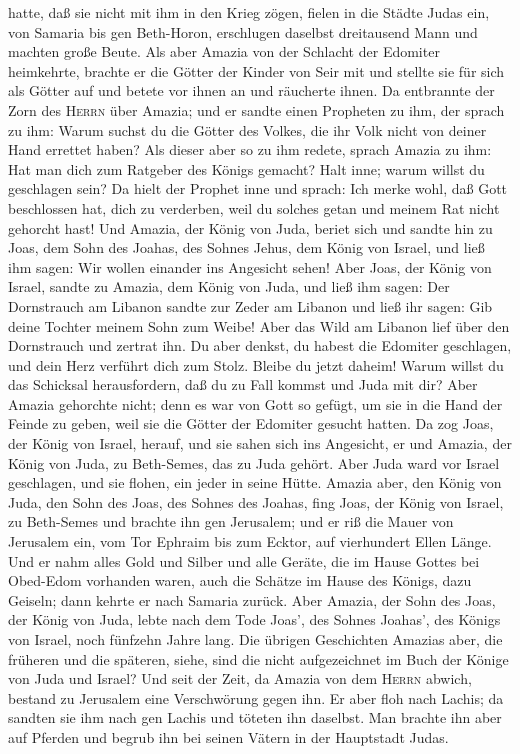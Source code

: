 hatte, daß sie nicht mit ihm in den Krieg zögen, fielen in die Städte
Judas ein, von Samaria bis gen Beth-Horon, erschlugen daselbst
dreitausend Mann und machten große Beute.  Als aber
Amazia von der Schlacht der Edomiter heimkehrte, brachte er die Götter
der Kinder von Seir mit und stellte sie für sich als Götter auf und
betete vor ihnen an und räucherte ihnen.  Da entbrannte
der Zorn des \textsc{Herrn} über Amazia; und er sandte einen Propheten
zu ihm, der sprach zu ihm: Warum suchst du die Götter des Volkes, die
ihr Volk nicht von deiner Hand errettet haben?  Als
dieser aber so zu ihm redete, sprach Amazia zu ihm: Hat man dich zum
Ratgeber des Königs gemacht? Halt inne; warum willst du geschlagen sein?
Da hielt der Prophet inne und sprach: Ich merke wohl, daß Gott
beschlossen hat, dich zu verderben, weil du solches getan und meinem Rat
nicht gehorcht hast!  Und Amazia, der König von Juda,
beriet sich und sandte hin zu Joas, dem Sohn des Joahas, des Sohnes
Jehus, dem König von Israel, und ließ ihm sagen: Wir wollen einander ins
Angesicht sehen!  Aber Joas, der König von Israel, sandte
zu Amazia, dem König von Juda, und ließ ihm sagen: Der Dornstrauch am
Libanon sandte zur Zeder am Libanon und ließ ihr sagen: Gib deine
Tochter meinem Sohn zum Weibe! Aber das Wild am Libanon lief über den
Dornstrauch und zertrat ihn.  Du aber denkst, du habest
die Edomiter geschlagen, und dein Herz verführt dich zum Stolz. Bleibe
du jetzt daheim! Warum willst du das Schicksal herausfordern, daß du zu
Fall kommst und Juda mit dir?  Aber Amazia gehorchte
nicht; denn es war von Gott so gefügt, um sie in die Hand der Feinde zu
geben, weil sie die Götter der Edomiter gesucht hatten. 
Da zog Joas, der König von Israel, herauf, und sie sahen sich ins
Angesicht, er und Amazia, der König von Juda, zu Beth-Semes, das zu Juda
gehört.  Aber Juda ward vor Israel geschlagen, und sie
flohen, ein jeder in seine Hütte.  Amazia aber, den König
von Juda, den Sohn des Joas, des Sohnes des Joahas, fing Joas, der König
von Israel, zu Beth-Semes und brachte ihn gen Jerusalem; und er riß die
Mauer von Jerusalem ein, vom Tor Ephraim bis zum Ecktor, auf vierhundert
Ellen Länge.  Und er nahm alles Gold und Silber und alle
Geräte, die im Hause Gottes bei Obed-Edom vorhanden waren, auch die
Schätze im Hause des Königs, dazu Geiseln; dann kehrte er nach Samaria
zurück.  Aber Amazia, der Sohn des Joas, der König von
Juda, lebte nach dem Tode Joas', des Sohnes Joahas', des Königs von
Israel, noch fünfzehn Jahre lang.  Die übrigen
Geschichten Amazias aber, die früheren und die späteren, siehe, sind die
nicht aufgezeichnet im Buch der Könige von Juda und Israel?
 Und seit der Zeit, da Amazia von dem \textsc{Herrn}
abwich, bestand zu Jerusalem eine Verschwörung gegen ihn. Er aber floh
nach Lachis; da sandten sie ihm nach gen Lachis und töteten ihn
daselbst.  Man brachte ihn aber auf Pferden und begrub
ihn bei seinen Vätern in der Hauptstadt Judas.

